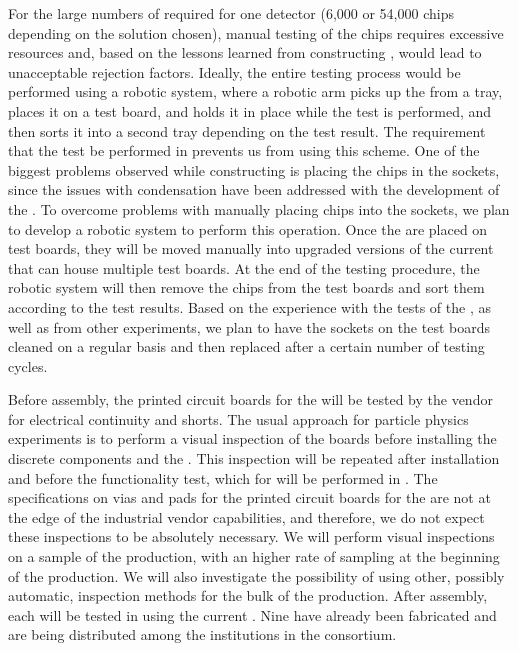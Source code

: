 For the large numbers of
 required for one   detector
(6,000 or 54,000 chips depending on the  solution
chosen), manual testing of the chips requires excessive 
resources and, based on the lessons learned from  
constructing  , would lead to unacceptable rejection
factors. Ideally, the entire testing
process would be performed using a robotic system, where 
a robotic arm picks up the  from a tray, places
it on a test board, and holds it in place while the test
is performed, and then sorts it into a second tray
depending on the test result. The requirement that the test
be performed in \lntwo prevents us from using this
scheme. One of the biggest problems observed while constructing
 is placing the chips in
the sockets, since the issues with condensation
have been addressed with the development of the .
To overcome problems with manually placing chips into
the sockets, we plan to develop a robotic system
to perform this operation. Once the  are 
placed on test boards, they will be moved manually into 
upgraded versions of the current  that can
house multiple test boards. At the end of the testing
procedure, the robotic system will then remove
the chips from the test boards and sort them according to
the test results. Based on the experience with the tests of
the  , as well as from other experiments,
we plan to have the sockets on the test boards cleaned on a regular 
basis and then replaced after a certain number of
testing cycles. 

Before assembly, the printed circuit boards for the
 will be tested by the vendor for electrical
continuity and shorts. The usual approach for particle physics
experiments is to perform a visual inspection of the boards
before installing the discrete components and 
the . This inspection will be repeated after 
installation and before the functionality test, which for  will
be performed in \lntwo. The specifications on vias and pads for the printed
circuit boards for the  are not at the edge of the
industrial vendor capabilities, and therefore, we do not
expect these inspections to be absolutely necessary. We will
perform visual inspections on a sample of the 
production, with an higher rate of sampling at the beginning
of the production. We will also investigate the possibility
of using other, possibly automatic, inspection methods for
the bulk of the production. After assembly, 
each  will be tested in \lntwo using
the current . Nine  have already been
fabricated and are being distributed among the institutions
in the consortium. 

